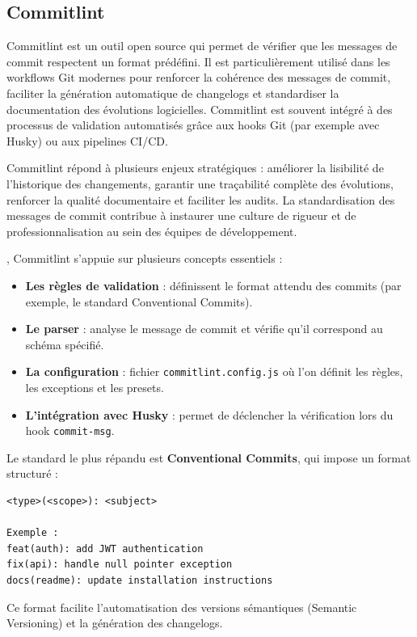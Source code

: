\subsection{Commitlint}

Commitlint est un outil open source qui permet de vérifier que les messages de commit respectent un format prédéfini. Il est particulièrement utilisé dans les workflows Git modernes pour renforcer la cohérence des messages de commit, faciliter la génération automatique de changelogs et standardiser la documentation des évolutions logicielles. Commitlint est souvent intégré à des processus de validation automatisés grâce aux hooks Git (par exemple avec Husky) ou aux pipelines CI/CD.

Commitlint répond à plusieurs enjeux stratégiques  : améliorer la lisibilité de l’historique des changements, garantir une traçabilité complète des évolutions, renforcer la qualité documentaire et faciliter les audits. La standardisation des messages de commit contribue à instaurer une culture de rigueur et de professionnalisation au sein des équipes de développement.

, Commitlint s’appuie sur plusieurs concepts essentiels  :
\begin{itemize}
	\item \textbf{Les règles de validation}  : définissent le format attendu des commits (par exemple, le standard Conventional Commits).
	\item \textbf{Le parser}  : analyse le message de commit et vérifie qu’il correspond au schéma spécifié.
	\item \textbf{La configuration}  : fichier \texttt{commitlint.config.js} où l’on définit les règles, les exceptions et les presets.
	\item \textbf{L’intégration avec Husky}  : permet de déclencher la vérification lors du hook \texttt{commit-msg}.
\end{itemize}

Le standard le plus répandu est \textbf{Conventional Commits}, qui impose un format structuré  :
\begin{verbatim}
<type>(<scope>): <subject>

Exemple :
feat(auth): add JWT authentication
fix(api): handle null pointer exception
docs(readme): update installation instructions
\end{verbatim}

Ce format facilite l’automatisation des versions sémantiques (Semantic Versioning) et la génération des changelogs.

